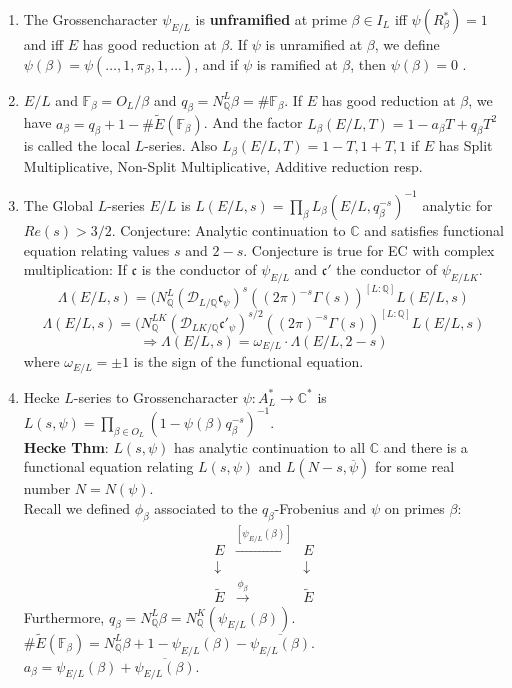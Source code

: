 \documentclass{article}
\newcommand{\Q}{\mathbb{Q}}
\newcommand{\C}{\mathbb{C}}
\newcommand{\F}{\mathbb{F}}
\newcommand{\DD}{\mathcal{D}}
\newcommand{\ra}{\rightarrow}
\newcommand{\Ra}{\Rightarrow}
\newcommand{\da}{\downarrow}
\newcommand{\raa}[1]{\overset{#1}{\longrightarrow}}
\begin{document}
\begin{multicols}{2}
\begin{enumerate}
\item The Grossencharacter $\psi_{E/L}$ is \textbf{unframified} at prime $\beta \in I_L$ iff $\psi(R_\beta^*) = 1$ and iff $E$ has good reduction at $\beta$. If $\psi$ is unramified at $\beta$, we define $\psi(\beta) = \psi(\ldots,1,\pi_\beta,1,\ldots)$, and  if $\psi$ is ramified at $\beta$, then $\psi(\beta) = 0$ .

\item $E/L$ and $\F_\beta = O_L/\beta$ and $q_\beta = N_\Q^L \beta = \# \F_\beta$. If $E$ has good reduction at $\beta$, we have $a_\beta = q_\beta + 1 - \#\tilde{E}(\F_\beta)$. And the factor $L_\beta(E/L,T) = 1 - a_\beta T + q_\beta T^2$ is called the local $L$-series. Also $L_\beta(E/L,T) = 1-T,1+T,1$ if $E$ has Split Multiplicative, Non-Split Multiplicative, Additive reduction resp.\\


\item The Global $L$-series $E/L$ is $L(E/L,s) = \prod_\beta L_\beta(E/L,q_\beta^{-s})^{-1}$ analytic for $Re(s) > 3/2$. Conjecture: Analytic continuation to $\C$ and satisfies functional equation relating values $s$ and $2-s$. Conjecture is true for EC with complex multiplication: If $\mathfrak{c}$ is the conductor of $\psi_{E/L}$ and $\mathfrak{c}'$ the conductor of $\psi_{E/LK}$.
\[\Lambda(E/L,s) = (N_\Q^{L}(\DD_{L/\Q}\mathfrak{c}_\psi)^s((2\pi)^{-s} \Gamma(s))^{[L:\Q]} L(E/L,s)\]
\[\Lambda(E/L,s) = (N_\Q^{LK}(\DD_{LK/\Q}\mathfrak{c}'_\psi)^{s/2}((2\pi)^{-s} \Gamma(s))^{[L:\Q]} L(E/L,s)\]
\[\Ra \Lambda(E/L,s) = \omega_{E/L} \cdot \Lambda(E/L,2-s)\]
where $\omega_{E/L} = \pm 1$ is the sign of the functional equation. 


\item Hecke $L$-series to Grossencharacter $\psi: A_L^* \ra \C^*$ is $L(s,\psi) = \prod_{\beta \in O_L} (1- \psi(\beta)q_\beta^{-s})^{-1}$. \\

\textbf{Hecke Thm}: $L(s,\psi)$ has analytic continuation to all $\C$ and there is a functional equation relating $L(s,\psi)$ and $L(N-s,\overline{\psi})$ for some real number $N = N(\psi)$.\\

Recall we defined $\phi_\beta$ associated to the $q_\beta$-Frobenius and $\psi$ on primes $\beta$:
\[\begin{array}{rcl}
E & \raa{[\psi_{E/L}(\beta)]} & E\\
\da & & \da \\
\tilde{E} & \raa{\phi_\beta} & \tilde{E}
\end{array}\]
Furthermore, $q_\beta = N_\Q^L\beta = N_\Q^K(\psi_{E/L}(\beta))$.\\
$\#\tilde{E}(\F_\beta) = N_\Q^L\beta + 1- \psi_{E/L}(\beta) - \overline{\psi_{E/L}(\beta)}$.\\
$a_\beta = \psi_{E/L}(\beta) + \overline{\psi_{E/L}(\beta)}$.\\


\end{enumerate}
\end{multicols}
\end{document}
